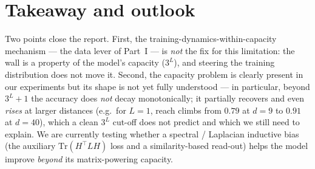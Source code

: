 \documentclass[11pt,a4paper]{article}
\begin{document}
\section{Takeaway and outlook} Two points close the report. First, the
training-dynamics-within-capacity mechanism --- the data lever of Part~I --- is
\emph{not} the fix for this limitation: the wall is a property of the model's
capacity ($3^L$), and steering the training distribution does not move it.
Second, the capacity problem is clearly present in our experiments but its shape
is not yet fully understood --- in particular, beyond $3^L{+}1$ the accuracy does
\emph{not} decay monotonically; it partially recovers and even \emph{rises} at
larger distances (e.g.\ for $L = 1$, reach climbs from $0.79$ at $d = 9$ to
$0.91$ at $d = 40$), which a clean $3^L$ cut-off does not predict and which we
still need to explain. We are currently testing whether a spectral / Laplacian
inductive bias (the auxiliary $\mathrm{Tr}(H^\top L H)$ loss and a
similarity-based read-out) helps the model improve \emph{beyond} its
matrix-powering capacity.
\end{document}
